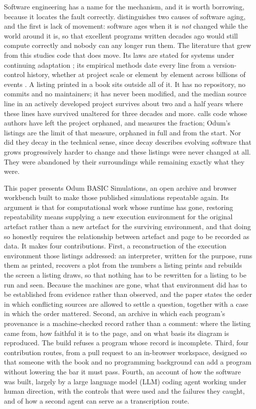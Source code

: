 Software engineering has a name for the mechanism, and it is worth borrowing, because it locates the fault correctly. \citet{parnas1994} distinguishes two causes of software aging, and the first is lack of movement: software ages when it is \emph{not} changed while the world around it is, so that excellent programs written decades ago would still compute correctly and nobody can any longer run them. The literature that grew from this studies code that does move. Its laws are stated for systems under continuing adaptation \citep{lehman1980}; its empirical methods date every line from a version-control history, whether at project scale \citep{robles2005} or element by element across billions of events \citep{spinellis2021}. A listing printed in a book sits outside all of it. It has no repository, no commits and no maintainers; it has never been modified, and the median source line in an actively developed project survives about two and a half years \citep{spinellis2021} where these lines have survived unaltered for three decades and more. \citet{robles2005} calls code whose authors have left the project orphaned, and measures the fraction; Odum's listings are the limit of that measure, orphaned in full and from the start. Nor did they decay in the technical sense, since decay describes evolving software that grows progressively harder to change \citep{eick2001} and these listings were never changed at all. They were abandoned by their surroundings while remaining exactly what they were.

This paper presents Odum BASIC Simulations, an open archive and browser workbench built to make those published simulations repeatable again. Its argument is that for computational work whose runtime has gone, restoring repeatability means supplying a new execution environment for the original artefact rather than a new artefact for the surviving environment, and that doing so honestly requires the relationship between artefact and page to be recorded as data. It makes four contributions. First, a reconstruction of the execution environment those listings addressed: an interpreter, written for the purpose, runs them as printed, recovers a plot from the numbers a listing prints and rebuilds the screen a listing draws, so that nothing has to be rewritten for a listing to be run and seen. Because the machines are gone, what that environment did has to be established from evidence rather than observed, and the paper states the order in which conflicting sources are allowed to settle a question, together with a case in which the order mattered. Second, an archive in which each program's provenance is a machine-checked record rather than a comment: where the listing came from, how faithful it is to the page, and on what basis its diagram is reproduced. The build refuses a program whose record is incomplete. Third, four contribution routes, from a pull request to an in-browser workspace, designed so that someone with the book and no programming background can add a program without lowering the bar it must pass. Fourth, an account of how the software was built, largely by a large language model (LLM) coding agent working under human direction, with the controls that were used and the failures they caught, and of how a second agent can serve as a transcription route.

